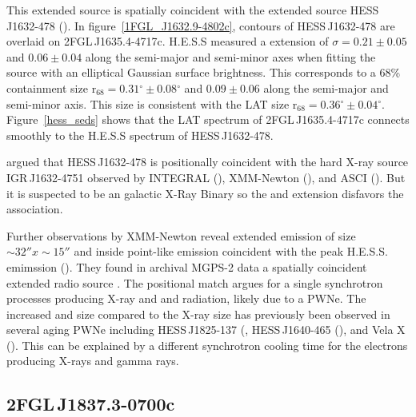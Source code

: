 \documentclass[12pt,preprint]{aastex}
\newcommand{\gev}{\text{GeV}\xspace}
\newcommand{\tev}{\text{TeV}\xspace}
\newcommand{\rsixeight}{{\ensuremath{\text{r}_{68}}}\xspace}
\renewcommand{\deg}{\ensuremath{^\circ}\xspace}
\renewcommand{\approx}{\sim\!\xspace}
\begin{document}
This extended source is spatially coincident with the extended
\tev source HESS\,J1632-478 (\cite{hess_plane_survey}).
In figure~\ref{1FGL_J1632.9-4802c}, contours of  HESS\,J1632-478
are overlaid on 2FGL\,J1635.4-4717c.  H.E.S.S measured a 
extension of $\sigma=0.21\pm0.05$ and $0.06\pm0.04$ along the
semi-major and semi-minor axes when fitting the source with an
elliptical Gaussian surface brightness.  This corresponds to a 68\%
containment size $\rsixeight=0.31\deg\pm0.08\deg$ and $0.09\pm0.06$
along the semi-major and semi-minor axis. This size is consistent with
the LAT size $\rsixeight=0.36\deg\pm0.04\deg$.  Figure~\ref{hess_seds}
shows that the LAT spectrum of 2FGL\,J1635.4-4717c connects smoothly to
the H.E.S.S spectrum of HESS\,J1632-478.

\cite{hess_plane_survey} argued that HESS\,J1632-478 is
positionally coincident with the hard X-ray source IGR\,J1632-4751
observed by INTEGRAL (\cite{Igr_J16320-4751_circ}), XMM-Newton
(\cite{xmm_newton_IGR_J16320-4751}), and ASCI (\cite{asca_plane_survey}).
But it is suspected to be an galactic X-Ray Binary so the \gev and \tev
extension disfavors the association.

Further observations by XMM-Newton reveal extended emission of size
$\approx32''x\approx15''$ and inside point-like emission coincident with
the peak H.E.S.S. emimssion (\cite{hess_j1632_478_xmm_newton}).  They
found in archival MGPS-2 data a spatially coincident extended radio source
\cite{most_survey_galactic_plane}.  The positional match argues for a
single synchrotron processes producing X-ray and \gev and \tev radiation,
likely due to a PWNe.  The increased \gev and \tev size compared
to the X-ray size has previously been observed in several aging PWNe
including HESS\,J1825-137 (\cite{hess_j1825_xmm_newton,hess_j1825_hess},
HESS\,J1640-465 (\cite{hess_plane_survey,xmm_newton_hess_j_1640-466}),
and Vela X (\cite{vela_x_rosat,vela_x_hess}).  This can be explained by
a different synchrotron cooling time for the electrons producing X-rays
and \tev gamma rays.

\subsection{2FGL\,J1837.3-0700c}
\label{section_2FGL_J1837.3-0700c}


\end{document}
